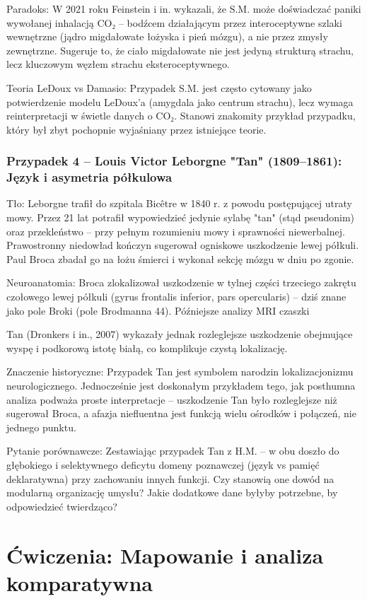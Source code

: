 \documentclass[11pt,a4paper]{article}
\begin{document}
Paradoks: W 2021 roku Feinstein i in. wykazali, że S.M. może doświadczać paniki wywołanej inhalacją CO₂ – bodźcem
działającym przez interoceptywne szlaki wewnętrzne (jądro migdałowate łożyska i pień mózgu), a nie przez zmysły
zewnętrzne. Sugeruje to, że ciało migdałowate nie jest jedyną strukturą strachu, lecz kluczowym węzłem strachu
eksteroceptywnego.

Teoria LeDoux vs Damasio: Przypadek S.M. jest często cytowany jako potwierdzenie modelu LeDoux'a (amygdala
jako centrum strachu), lecz wymaga reinterpretacji w świetle danych o CO₂. Stanowi znakomity przykład przypadku,
który był zbyt pochopnie wyjaśniany przez istniejące teorie.

\subsubsection*{Przypadek 4 – Louis Victor Leborgne "Tan" (1809–1861): Język i asymetria półkulowa}
Tło: Leborgne trafił do szpitala Bicêtre w 1840 r. z powodu postępującej utraty mowy. Przez 21 lat potrafił
wypowiedzieć jedynie sylabę "tan" (stąd pseudonim) oraz przekleństwo – przy pełnym rozumieniu mowy
i sprawności niewerbalnej. Prawostronny niedowład kończyn sugerował ogniskowe uszkodzenie lewej półkuli. Paul
Broca zbadał go na łożu śmierci i wykonał sekcję mózgu w dniu po zgonie.

Neuroanatomia: Broca zlokalizował uszkodzenie w tylnej części trzeciego zakrętu czołowego lewej półkuli (gyrus
frontalis inferior, pars opercularis) – dziś znane jako pole Broki (pole Brodmanna 44). Późniejsze analizy MRI czaszki

Tan (Dronkers i in., 2007) wykazały jednak rozleglejsze uszkodzenie obejmujące wyspę i podkorową istotę białą, co
komplikuje czystą lokalizację.

Znaczenie historyczne: Przypadek Tan jest symbolem narodzin lokalizacjonizmu neurologicznego. Jednocześnie jest
doskonałym przykładem tego, jak posthumna analiza podważa proste interpretacje – uszkodzenie Tan było
rozleglejsze niż sugerował Broca, a afazja niefluentna jest funkcją wielu ośrodków i połączeń, nie jednego punktu.

Pytanie porównawcze: Zestawiając przypadek Tan z H.M. – w obu doszło do głębokiego i selektywnego deficytu
domeny poznawczej (język vs pamięć deklaratywna) przy zachowaniu innych funkcji. Czy stanowią one dowód na
modularną organizację umysłu? Jakie dodatkowe dane byłyby potrzebne, by odpowiedzieć twierdząco?


\section{Ćwiczenia: Mapowanie i analiza komparatywna}
\end{document}
